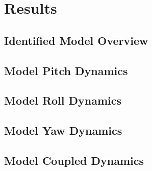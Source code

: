 \chapter{Results}

\section{Identified Model Overview}


\section{Model Pitch Dynamics}


\section{Model Roll Dynamics}


\section{Model Yaw Dynamics}


\section{Model Coupled Dynamics}